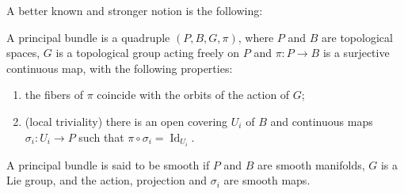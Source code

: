 \documentclass[11pt]{article}
\begin{document}
A better known and stronger notion is the following:
\begin{defi} A principal bundle is a quadruple $(P,B,G,\pi)$, where $P$ and $B$ are topological spaces, $G$ is a topological group acting freely on $P$ and $\pi\colon P\rightarrow B$ is a surjective continuous map, with the following properties:
\begin{enumerate}\itemsep=0pt
\item[1)] the fibers of $\pi$ coincide with the orbits of the action of $G$;
\item[2)] (local triviality) there is an open covering $U_i$ of $B$ and continuous maps $\sigma_i\colon U_i\rightarrow P$ such that $\pi\circ\sigma_i=\operatorname{Id}_{U_i}$.
\end{enumerate}
A principal bundle is said to be smooth if $P$ and $B$ are smooth manifolds, $G$ is a Lie group, and the action, projection and $\sigma_i$ are smooth maps.
\end{defi}
\end{document}
